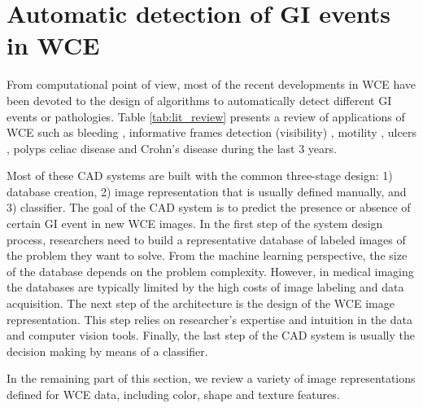 \documentclass[review,12pt,3p]{elsarticle}
\begin{document}
\section{Automatic detection of GI events in WCE}

From computational point of view, most of the recent developments in WCE have been devoted to the design of algorithms to automatically detect different GI events or pathologies. Table \ref{tab:lit_review} presents a review of applications of WCE such as bleeding \cite{figueiredo2013computer,Sainju2014,6497444,yeh2014bleeding}, informative frames detection (visibility) \cite{sseguiTurbid,Sun2013,maghsoudi2014informative, Suenaga2014Bubbles, zhao2015general}, motility \cite{sseguiWrinkles, Malagelada2015, Drozdzal2015}, ulcers \cite{Eid2013,yeh2014bleeding}, polyps \cite{polypsMamonov,yuanpolyp,silivaPolyp2014, zhao2015general} celiac disease \cite{ciaccio2013implementation} and Crohn's disease \cite{6051474} during the last 3 years.

Most of these CAD systems are built with the common three-stage design: 1) database creation, 2) image representation that is usually defined manually, and 3) classifier. The goal of the CAD system is to predict the presence or absence of certain GI event in new WCE images. In the first step of the system design process, researchers need to build a representative database of labeled images of the problem they want to solve. From the machine learning perspective, the size of the database depends on the problem complexity. However, in medical imaging the databases are typically limited by the high costs of image labeling and data acquisition. The next step of the architecture is the design of the WCE image representation. This step relies on researcher's expertise and intuition in the data and computer vision tools. Finally, the last step of the CAD system is usually the decision making by means of a classifier. 

In the remaining part of this section, we review a variety of image representations defined for WCE data, including color, shape and texture features.
\end{document}
